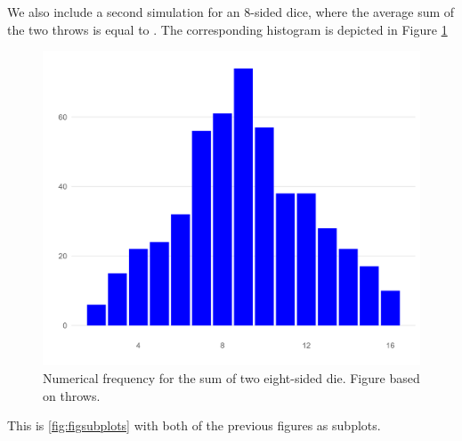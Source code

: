 \documentclass[12pt]{article}
\theoremstyle{definition}
\begin{document}
We also include a second simulation for an 8-sided dice, where the average sum of the two throws is equal to \unskip. The corresponding histogram is depicted in Figure \ref{fig:hist_500_8} 
\begin{figure}[tbh!]
\centering
\includegraphics[width=.8\linewidth]{plot/500_8/hist.png}
\caption[]{Numerical frequency for the sum of two eight-sided die. Figure based on throws.}
\label{fig:hist_500_8}
\end{figure}

\newpage

This is \ref{fig:figsubplots} with both of the previous figures as subplots. 
\end{document}

